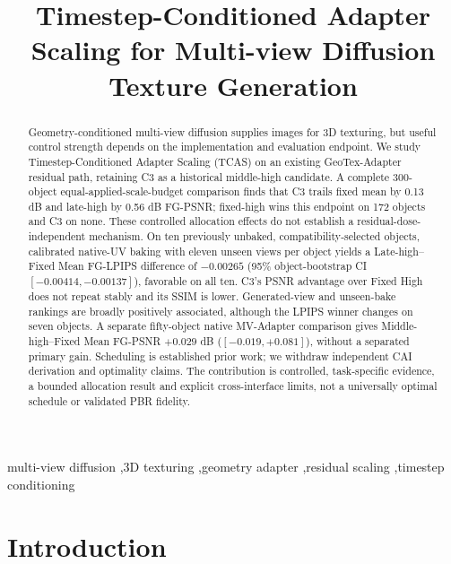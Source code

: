 \documentclass[times,twocolumn,final]{elsarticle}
\begin{document}
\begin{frontmatter}

\title{Timestep-Conditioned Adapter Scaling for Multi-view Diffusion Texture Generation}


\begin{abstract}
Geometry-conditioned multi-view diffusion supplies images for 3D texturing, but useful control strength depends on the implementation and evaluation endpoint. We study Timestep-Conditioned Adapter Scaling (TCAS) on an existing GeoTex-Adapter residual path, retaining C3 as a historical middle-high candidate. A complete 300-object equal-applied-scale-budget comparison finds that C3 trails fixed mean by 0.13 dB and late-high by 0.56 dB FG-PSNR; fixed-high wins this endpoint on 172 objects and C3 on none. These controlled allocation effects do not establish a residual-dose-independent mechanism. On ten previously unbaked, compatibility-selected objects, calibrated native-UV baking with eleven unseen views per object yields a Late-high--Fixed Mean FG-LPIPS difference of $-0.00265$ (95\% object-bootstrap CI $[-0.00414,-0.00137]$), favorable on all ten. C3's PSNR advantage over Fixed High does not repeat stably and its SSIM is lower. Generated-view and unseen-bake rankings are broadly positively associated, although the LPIPS winner changes on seven objects. A separate fifty-object native MV-Adapter comparison gives Middle-high--Fixed Mean FG-PSNR $+0.029$ dB ($[-0.019,+0.081]$), without a separated primary gain. Scheduling is established prior work; we withdraw independent CAI derivation and optimality claims. The contribution is controlled, task-specific evidence, a bounded allocation result and explicit cross-interface limits, not a universally optimal schedule or validated PBR fidelity.
\end{abstract}

\begin{keyword}
\KWD
multi-view diffusion \sep 3D texturing \sep geometry adapter \sep residual scaling \sep timestep conditioning
\end{keyword}

\end{frontmatter}

\linenumbers

\section{Introduction}
\label{sec:intro}
\end{document}
